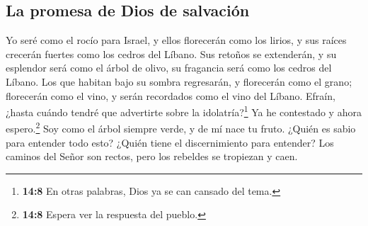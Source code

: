 \hypertarget{la-promesa-de-dios-de-salvaciuxf3n}{%
\subsection{La promesa de Dios de
salvación}\label{la-promesa-de-dios-de-salvaciuxf3n}}

 Yo seré como el rocío para Israel, y ellos florecerán
como los lirios, y sus raíces crecerán fuertes como los cedros del
Líbano.  Sus retoños se extenderán, y su esplendor será
como el árbol de olivo, su fragancia será como los cedros del Líbano.
 Los que habitan bajo su sombra regresarán, y florecerán
como el grano; florecerán como el vino, y serán recordados como el vino
del Líbano.  Efraín, ¿hasta cuándo tendré que advertirte
sobre la idolatría?\footnote{\textbf{14:8} En otras palabras, Dios ya se
  can cansado del tema.} Ya he contestado y ahora espero.\footnote{\textbf{14:8}
  Espera ver la respuesta del pueblo.} Soy como el árbol siempre verde,
y de mí nace tu fruto.  ¿Quién es sabio para entender todo
esto? ¿Quién tiene el discernimiento para entender? Los caminos del
Señor son rectos, pero los rebeldes se tropiezan y caen.
